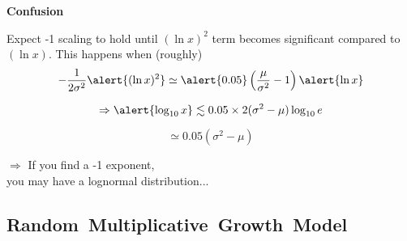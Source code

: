     
  


  \textbf{Confusion}

  
  
     Expect -1 scaling to hold until $(\ln{x})^2$ term 
    becomes significant compared to $(\ln{x})$.
     This happens when (roughly)
   $$
    -\frac{1}
    {2\sigma^2}
    \alert{  (\ln x)^2}
    \simeq
    \alert{0.05}
    \left(
      \frac{\mu}{\sigma^2} - 1
    \right)
    \alert{\ln x  }
    $$
  
    $$
    \Rightarrow
    \alert{\log_{10} x}
    \lesssim
    0.05\times2(\sigma^2 - \mu) 
    \log_{10} e
    $$
  
    $$
    \simeq 0.05 (\sigma^2 - \mu) 
    $$
  
    $\Rightarrow$ If you find a -1 exponent,\\
    \qquad you may have a lognormal distribution...
  
  



\subsection{Random\ Multiplicative\ Growth\ Model}

